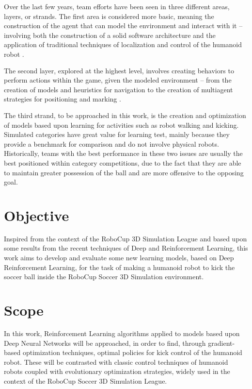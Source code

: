 Over the last few years, team efforts have been seen in three different areas, layers, or strands. The first area is considered more basic, meaning the construction of the agent that can model the environment and interact with it -- involving both the construction of a solid software architecture and the application of traditional techniques of localization and control of the humanoid robot \cite{AI1110-macalpine}.

The second layer, explored at the highest level, involves creating behaviors to perform actions within the game, given the modeled environment -- from the creation of models and heuristics for navigation to the creation of multiagent strategies for positioning and marking \cite{LNAI16-MacAlpine}.

The third strand, to be approached in this work, is the creation and optimization of models based upon learning for activities such as robot walking and kicking. Simulated categories have great value for learning test, mainly because they provide a benchmark for comparison and do not involve physical robots. Historically, teams with the best performance in these two issues are usually the best positioned within category competitions, due to the fact that they are able to maintain greater possession of the ball and are more offensive to the opposing goal.

\section{Objective}

Inspired from the context of the RoboCup 3D Simulation League and based upon some results from the recent techniques of Deep and Reinforcement Learning, this work aims to develop and evaluate some new learning models, based on Deep Reinforcement Learning, for the task of making a humanoid robot to kick the soccer ball inside the RoboCup Soccer 	3D Simulation environment.

\section{Scope}

In this work, Reinforcement Learning algorithms applied to models based upon Deep Neural Networks will be approached, in order to find, through gradient-based optimization techniques, optimal policies for kick control of the humanoid robot. These will be contrasted with classic control techniques of humanoid robots coupled with evolutionary optimization strategies, widely used in the context of the RoboCup Soccer 3D Simulation League.

